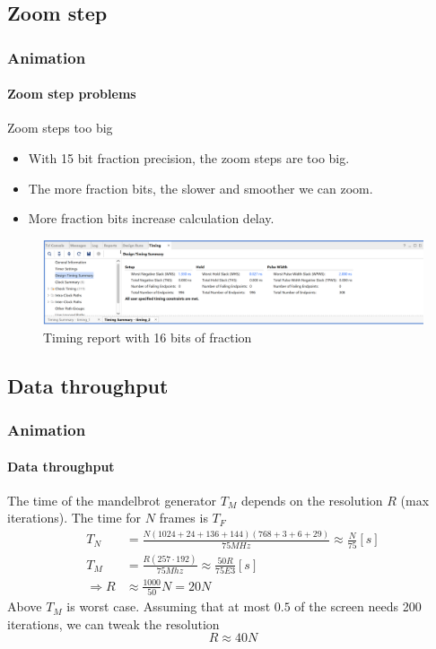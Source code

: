 \documentclass{beamer}
\begin{document}
\subsection{Zoom step}
\begin{frame}
    \frametitle{Animation}
    \framesubtitle{Zoom step problems}
    \begin{alertblock}{Zoom steps too big}
        \begin{itemize}
            \item With 15 bit fraction precision, the zoom steps are too big.
            \item The more fraction bits, the slower and smoother we can zoom.
            \item More fraction bits increase calculation delay.
        \end{itemize}
        \begin{figure}
            \caption{Timing report with 16 bits of fraction}
            \includegraphics[width=\textwidth]{../imgs/timing_report.PNG}
        \end{figure}
    \end{alertblock}
\end{frame}

\subsection{Data throughput}
\begin{frame}
    \frametitle{Animation}
    \framesubtitle{Data throughput}
    The time of the mandelbrot generator $T_M$ depends on the resolution $R$ (max iterations). The time for $N$ frames is $T_F$
    \begin{equation}
        \begin{split}
            T_N&= \frac{N(1024 + 24 + 136 + 144)(768 + 3 + 6 + 29)}{75MHz}\approx\frac{N}{75}[s]\\
            T_M &=   \frac{R(257\cdot192)}{75Mhz}\approx\frac{50R}{75E3}[s]\\
            \Rightarrow R &\approx \frac{1000}{50}N = 20N
        \end{split}
    \end{equation}
    Above $T_M$ is worst case. Assuming that at most $0.5$ of the screen needs 200 iterations, we can tweak the resolution
    \begin{equation}
        R \approx 40N
    \end{equation}
\end{frame}
\end{document}
